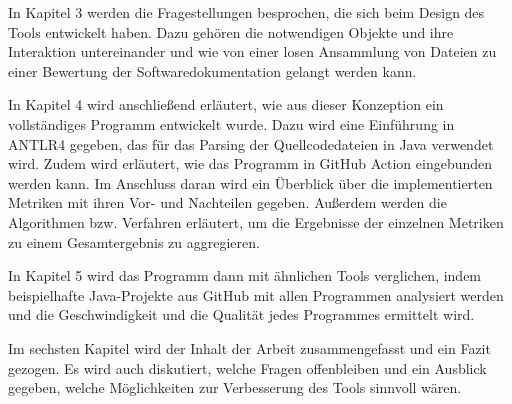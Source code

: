 In Kapitel 3 werden die Fragestellungen besprochen, die sich beim Design des Tools entwickelt haben. Dazu gehören die notwendigen Objekte und ihre Interaktion untereinander und wie von einer losen Ansammlung von Dateien zu einer Bewertung der Softwaredokumentation gelangt werden kann.

In Kapitel 4 wird anschließend erläutert, wie aus dieser Konzeption ein vollständiges Programm entwickelt wurde. Dazu wird eine Einführung in ANTLR4 gegeben, das für das Parsing der Quellcodedateien in Java verwendet wird. Zudem wird erläutert, wie das Programm in GitHub Action eingebunden werden kann. Im Anschluss daran wird ein Überblick über die implementierten Metriken mit ihren Vor- und Nachteilen gegeben. Außerdem werden die Algorithmen bzw. Verfahren erläutert, um die Ergebnisse der einzelnen Metriken zu einem Gesamtergebnis zu aggregieren. 

In Kapitel 5 wird das Programm dann mit ähnlichen Tools verglichen, indem beispielhafte Java-Projekte aus GitHub mit allen Programmen analysiert werden und die Geschwindigkeit und die Qualität jedes Programmes ermittelt wird. 

Im sechsten Kapitel wird der Inhalt der Arbeit zusammengefasst und ein Fazit gezogen. Es wird auch diskutiert, welche Fragen offenbleiben und ein Ausblick gegeben, welche Möglichkeiten zur Verbesserung des Tools sinnvoll wären. 
